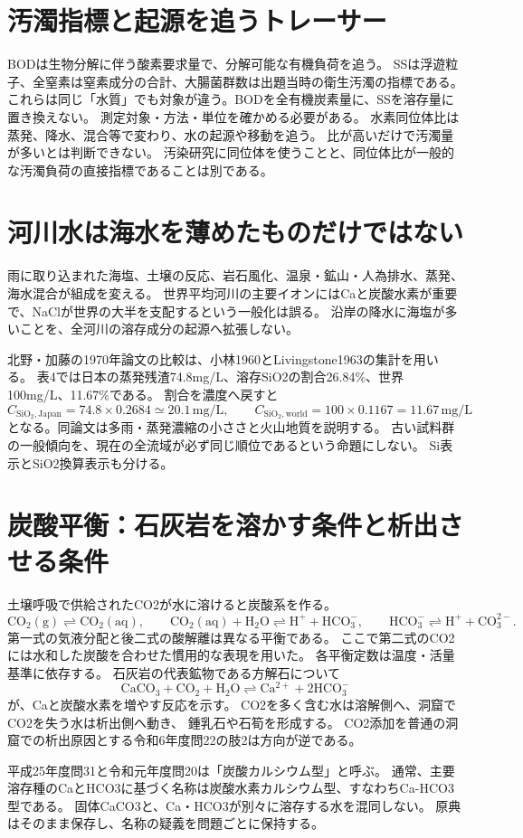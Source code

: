 \section{汚濁指標と起源を追うトレーサー}
\label{theory:geochemistry:indicators}
BODは生物分解に伴う酸素要求量で、分解可能な有機負荷を追う。
SSは浮遊粒子、全窒素は窒素成分の合計、大腸菌群数は出題当時の衛生汚濁の指標である。
これらは同じ「水質」でも対象が違う。BODを全有機炭素量に、SSを溶存量に置き換えない。
測定対象・方法・単位を確かめる必要がある\cite{gc_hem}。
水素同位体比は蒸発、降水、混合等で変わり、水の起源や移動を追う。
比が高いだけで汚濁量が多いとは判断できない。
汚染研究に同位体を使うことと、同位体比が一般的な汚濁負荷の直接指標であることは別である。

\section{河川水は海水を薄めたものだけではない}
\label{theory:geochemistry:river}
雨に取り込まれた海塩、土壌の反応、岩石風化、温泉・鉱山・人為排水、蒸発、海水混合が組成を変える。
世界平均河川の主要イオンにはCaと炭酸水素が重要で、NaClが世界の大半を支配するという一般化は誤る。
沿岸の降水に海塩が多いことを、全河川の溶存成分の起源へ拡張しない。

北野・加藤の1970年論文の比較は、小林1960とLivingstone1963の集計を用いる。
表4では日本の蒸発残渣74.8mg/L、溶存SiO2の割合26.84\%、世界100mg/L、11.67\%である。
割合を濃度へ戻すと
\[
 C_{\mathrm{SiO_2,Japan}}=74.8\times0.2684\simeq20.1\,\mathrm{mg/L},\qquad
 C_{\mathrm{SiO_2,world}}=100\times0.1167=11.67\,\mathrm{mg/L}
\]
となる。同論文は多雨・蒸発濃縮の小ささと火山地質を説明する\cite{gc_river1970}。
古い試料群の一般傾向を、現在の全流域が必ず同じ順位であるという命題にしない。
Si表示とSiO2換算表示も分ける。

\section{炭酸平衡：石灰岩を溶かす条件と析出させる条件}
\label{theory:geochemistry:carbonate}
土壌呼吸で供給されたCO2が水に溶けると炭酸系を作る。
\[
 \mathrm{CO_2(g)\rightleftharpoons CO_2(aq)},\qquad
 \mathrm{CO_2(aq)+H_2O\rightleftharpoons H^++HCO_3^-},\qquad
 \mathrm{HCO_3^-\rightleftharpoons H^++CO_3^{2-}} .
\]
第一式の気液分配と後二式の酸解離は異なる平衡である。
ここで第二式のCO2には水和した炭酸を合わせた慣用的な表現を用いた。
各平衡定数は温度・活量基準に依存する。
石灰岩の代表鉱物である方解石について
\[
 \mathrm{CaCO_3+CO_2+H_2O\rightleftharpoons Ca^{2+}+2HCO_3^-}
\]
が、Caと炭酸水素を増やす反応を示す。
CO2を多く含む水は溶解側へ、洞窟でCO2を失う水は析出側へ動き、
鍾乳石や石筍を形成する\cite{gc_hem,gc_cave}。
CO2添加を普通の洞窟での析出原因とする令和6年度問22の肢2は方向が逆である。
\begin{tcolorbox}[title=原典の水質名を科学的な文へ書き換えない]
平成25年度問31と令和元年度問20は「炭酸カルシウム型」と呼ぶ。
通常、主要溶存種のCaとHCO3に基づく名称は炭酸水素カルシウム型、すなわちCa-HCO3型である。
固体CaCO3と、Ca・HCO3が別々に溶存する水を混同しない\cite{gc_hem}。
原典はそのまま保存し、名称の疑義を問題ごとに保持する。
\end{tcolorbox}

